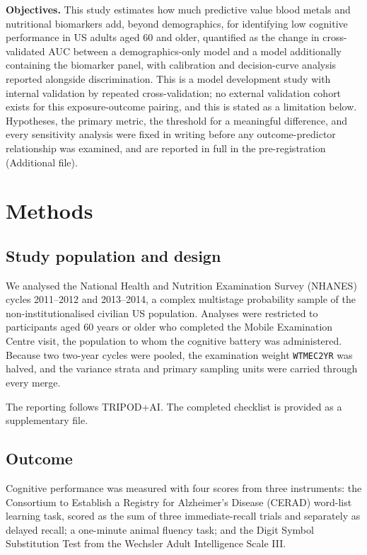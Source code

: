 \documentclass[12pt]{article}
\begin{document}
\textbf{Objectives.} This study estimates how much predictive value blood metals and nutritional biomarkers add, beyond demographics, for identifying low cognitive performance in US adults aged 60 and older, quantified as the change in cross-validated AUC between a demographics-only model and a model additionally containing the biomarker panel, with calibration and decision-curve analysis reported alongside discrimination. This is a model development study with internal validation by repeated cross-validation; no external validation cohort exists for this exposure-outcome pairing, and this is stated as a limitation below. Hypotheses, the primary metric, the threshold for a meaningful difference, and every sensitivity analysis were fixed in writing before any outcome-predictor relationship was examined, and are reported in full in the pre-registration (Additional file).

\section*{Methods}

\subsection*{Study population and design}

We analysed the National Health and Nutrition Examination Survey (NHANES) cycles 2011--2012 and 2013--2014, a complex multistage probability sample of the non-institutionalised civilian US population. Analyses were restricted to participants aged 60 years or older who completed the Mobile Examination Centre visit, the population to whom the cognitive battery was administered. Because two two-year cycles were pooled, the examination weight \texttt{WTMEC2YR} was halved, and the variance strata and primary sampling units were carried through every merge.

The reporting follows TRIPOD+AI. The completed checklist is provided as a supplementary file.

\subsection*{Outcome}

Cognitive performance was measured with four scores from three instruments: the Consortium to Establish a Registry for Alzheimer's Disease (CERAD) word-list learning task, scored as the sum of three immediate-recall trials and separately as delayed recall; a one-minute animal fluency task; and the Digit Symbol Substitution Test from the Wechsler Adult Intelligence Scale III.
\end{document}
